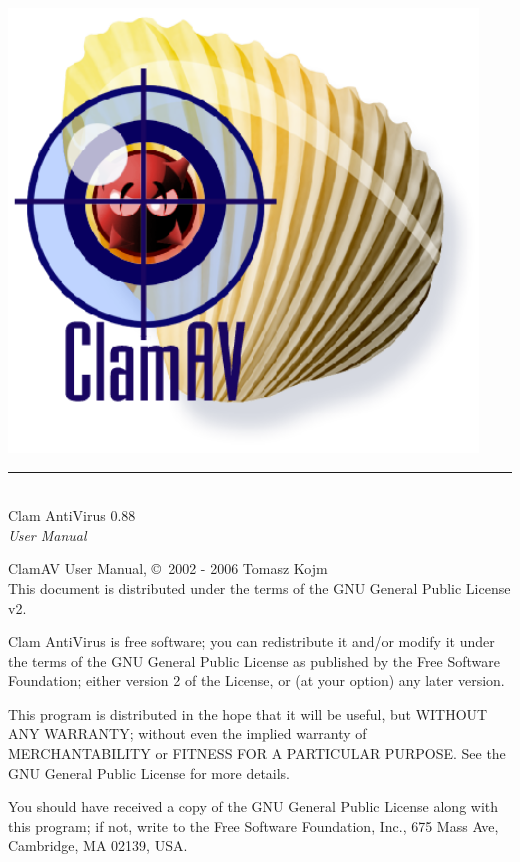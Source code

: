 \documentclass[a4paper,titlepage,12pt]{article}
\date{}
\begin{document}
    \setcounter{page}{0}

    \pagestyle{empty}
    \includegraphics[width=353pt]{clam.eps}
    \vspace{3cm}
    \begin{flushright}
	\rule[-1ex]{8cm}{3pt}\\
	\huge Clam AntiVirus 0.88\\
	\huge \emph{User Manual}\\
    \end{flushright}

    \newpage
    \pagestyle{fancy}
    \tableofcontents
    \vspace{9.5cm}

    \noindent
    \begin{boxedminipage}[b]{\textwidth}
    ClamAV User Manual, \copyright \  2002 - 2006 Tomasz Kojm\\
    This document is distributed under the terms of the GNU General
    Public License v2.
    \end{boxedminipage}

    \vspace{1.0cm}

    \noindent
    \begin{boxedminipage}[b]{\textwidth}
    Clam AntiVirus is free software; you can redistribute it and/or modify
    it under the terms of the GNU General Public License as published by
    the Free Software Foundation; either version 2 of the License, or
    (at your option) any later version.

    This program is distributed in the hope that it will be useful,
    but WITHOUT ANY WARRANTY; without even the implied warranty of
    MERCHANTABILITY or FITNESS FOR A PARTICULAR PURPOSE.  See the
    GNU General Public License for more details.

    You should have received a copy of the GNU General Public License
    along with this program; if not, write to the Free Software
    Foundation, Inc., 675 Mass Ave, Cambridge, MA 02139, USA.
    \end{boxedminipage}
\end{document}
